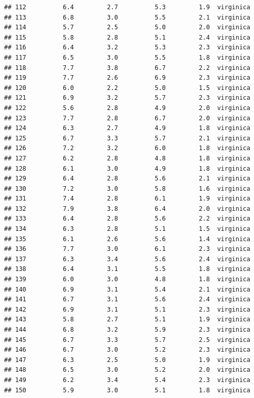\documentclass[
]{book}
\begin{document}
\begin{verbatim}
## 112          6.4         2.7          5.3         1.9  virginica
## 113          6.8         3.0          5.5         2.1  virginica
## 114          5.7         2.5          5.0         2.0  virginica
## 115          5.8         2.8          5.1         2.4  virginica
## 116          6.4         3.2          5.3         2.3  virginica
## 117          6.5         3.0          5.5         1.8  virginica
## 118          7.7         3.8          6.7         2.2  virginica
## 119          7.7         2.6          6.9         2.3  virginica
## 120          6.0         2.2          5.0         1.5  virginica
## 121          6.9         3.2          5.7         2.3  virginica
## 122          5.6         2.8          4.9         2.0  virginica
## 123          7.7         2.8          6.7         2.0  virginica
## 124          6.3         2.7          4.9         1.8  virginica
## 125          6.7         3.3          5.7         2.1  virginica
## 126          7.2         3.2          6.0         1.8  virginica
## 127          6.2         2.8          4.8         1.8  virginica
## 128          6.1         3.0          4.9         1.8  virginica
## 129          6.4         2.8          5.6         2.1  virginica
## 130          7.2         3.0          5.8         1.6  virginica
## 131          7.4         2.8          6.1         1.9  virginica
## 132          7.9         3.8          6.4         2.0  virginica
## 133          6.4         2.8          5.6         2.2  virginica
## 134          6.3         2.8          5.1         1.5  virginica
## 135          6.1         2.6          5.6         1.4  virginica
## 136          7.7         3.0          6.1         2.3  virginica
## 137          6.3         3.4          5.6         2.4  virginica
## 138          6.4         3.1          5.5         1.8  virginica
## 139          6.0         3.0          4.8         1.8  virginica
## 140          6.9         3.1          5.4         2.1  virginica
## 141          6.7         3.1          5.6         2.4  virginica
## 142          6.9         3.1          5.1         2.3  virginica
## 143          5.8         2.7          5.1         1.9  virginica
## 144          6.8         3.2          5.9         2.3  virginica
## 145          6.7         3.3          5.7         2.5  virginica
## 146          6.7         3.0          5.2         2.3  virginica
## 147          6.3         2.5          5.0         1.9  virginica
## 148          6.5         3.0          5.2         2.0  virginica
## 149          6.2         3.4          5.4         2.3  virginica
## 150          5.9         3.0          5.1         1.8  virginica
\end{verbatim}
\end{document}
